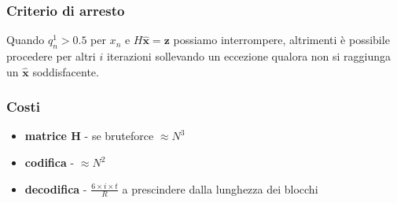 \documentclass{article}
\begin{document}
	\subsubsection{Criterio di arresto}
	Quando $q^1_n >0.5$ per $x_n$ e $H\hat{\textbf{x}}=\textbf{z}$ possiamo interrompere, altrimenti è possibile procedere per altri $i$ iterazioni sollevando un eccezione qualora non si raggiunga un $\hat{\textbf{x}}$ soddisfacente.
	\subsubsection{Costi}
	\begin{itemize}
		\item \textbf{matrice H} - se bruteforce $\approx N^3$
		\item \textbf{codifica} - $\approx N^2$
		\item \textbf{decodifica} - $ \frac{6 \times i \times t}{R} $ a prescindere dalla lunghezza dei blocchi
	\end{itemize}
\end{document}
